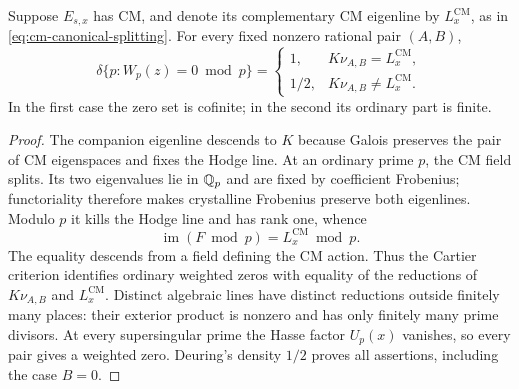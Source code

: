 \begin{proposition}
\label{prop:cm-weighted-slope}
Suppose $E_{s,x}$ has CM, and denote its complementary CM eigenline
by $L_x^{\mathrm{CM}}$, as in \eqref{eq:cm-canonical-splitting}.
For every fixed nonzero rational pair $(A,B)$,
\[
 \delta\{p:W_p(z)=0\bmod p\}=
 \begin{cases}
 1,&K\nu_{A,B}=L_x^{\mathrm{CM}},\\
 1/2,&K\nu_{A,B}\ne L_x^{\mathrm{CM}}.
 \end{cases}
\]
In the first case the zero set is cofinite; in the second its
ordinary part is finite.
\end{proposition}
\begin{proof}
The companion eigenline descends to $K$ because Galois preserves
the pair of CM eigenspaces and fixes the Hodge line.  At an
ordinary prime $p$, the CM field splits.  Its two eigenvalues lie
in $\mathbb Q_p$ and are fixed by coefficient Frobenius; functoriality
therefore makes crystalline Frobenius preserve both eigenlines.
Modulo $p$ it kills the Hodge line and has rank one, whence
\[
                  \operatorname{im}(F\bmod p)
                          =L_x^{\mathrm{CM}}\bmod p.
\]
The equality descends from a field defining the CM action.  Thus
the Cartier criterion identifies ordinary weighted zeros with
equality of the reductions of $K\nu_{A,B}$ and
$L_x^{\mathrm{CM}}$.  Distinct algebraic lines have distinct
reductions outside finitely many places: their exterior product
is nonzero and has only finitely many prime divisors.  At every
supersingular prime the Hasse factor $U_p(x)$ vanishes, so every
pair gives a weighted zero.  Deuring's density $1/2$ proves all
assertions, including the case $B=0$.
\end{proof}

